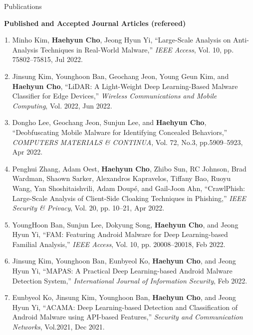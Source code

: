\documentclass{resume} %
\begin{document}
\begin{rSection}{\faGenderless~Publications}
	\vspace{3mm}
	
    \strut\textbullet~{\bf Published and Accepted Journal Articles (refereed)}
    \begin{enumerate}[leftmargin=0pt]
		\item Minho Kim, \textbf{Haehyun Cho}, Jeong Hyun Yi, 
		``Large-Scale Analysis on Anti-Analysis Techniques in Real-World Malware,''
		\emph{IEEE Access}, 
		Vol. 10,  pp. 75802--75815, Jul 2022.

		\item Jinsung Kim, Younghoon Ban, Geochang Jeon, Young Geun Kim, and \textbf{Haehyun Cho}, 
		``LiDAR: A Light-Weight Deep Learning-Based Malware Classifier for Edge Devices,''
		\emph{Wireless Communications and Mobile Computing}, 
		Vol. 2022, Jun 2022.

		\item Dongho Lee, Geochang Jeon, Sunjun Lee, and \textbf{Haehyun Cho},
		``Deobfuscating Mobile Malware for Identifying Concealed Behaviors,''
		\emph{COMPUTERS MATERIALS \& CONTINUA}, 
		Vol. 72, No.3, pp.5909--5923, Apr 2022.
		
		\item Penghui Zhang, Adam Oest, \textbf{Haehyun Cho}, Zhibo Sun, RC Johnson, Brad Wardman, Shaown Sarker, Alexandros Kapravelos, Tiffany Bao, Ruoyu Wang, Yan Shoshitaishvili, Adam Doup\'e, and Gail-Joon Ahn,
		``CrawlPhish: Large-Scale Analysis of Client-Side Cloaking Techniques in Phishing,''
		\emph{IEEE Security \& Privacy}, 
		Vol. 20, pp. 10--21, Apr 2022. 

		\item YoungHoon Ban, Sunjun Lee, Dokyung Song, \textbf{Haehyun Cho}, and Jeong Hyun Yi,
		``FAM: Featuring Android Malware for Deep Learning-based Familial Analysis,'' 
		\emph{IEEE Access}, 
		Vol. 10, pp. 20008--20018, Feb 2022.
		
		\item Jinsung Kim, Younghoon Ban, Eunbyeol Ko, \textbf{Haehyun Cho}, and Jeong Hyun Yi,
		``MAPAS: A Practical Deep Learning-based Android Malware Detection System,''
		\emph{International Journal of Information Security}, 
		Feb 2022.
		
		\item Eunbyeol Ko, Jinsung Kim, Younghoon Ban, \textbf{Haehyun Cho}, and Jeong Hyun Yi, 
		``ACAMA: Deep Learning-based Detection and Classification of Android Malware using API-based Features,''
		\emph{Security and Communication Networks}, 
		Vol.2021, Dec 2021.
		

\end{enumerate}
\end{rSection}
\end{document}
